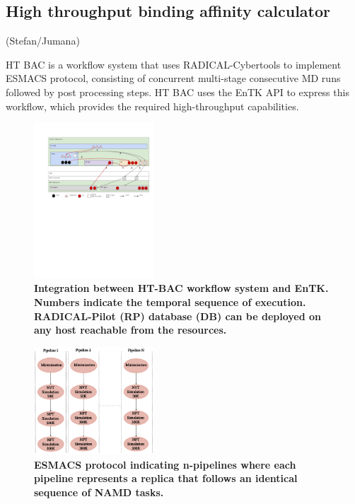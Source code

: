 \subsection{High throughput binding affinity calculator}

(Stefan/Jumana)

HT BAC is a workflow system that uses RADICAL-Cybertools to implement ESMACS protocol, consisting of concurrent multi-stage consecutive MD runs followed by post processing steps. HT BAC uses the EnTK API to express this workflow, which provides the required high-throughput capabilities. 

\begin{figure}[tb]
\centering
  \includegraphics[width=0.4\textwidth]{FIGURES/ht-bac-rp_integration.pdf}
  \caption{\bf Integration between HT-BAC workflow system and EnTK. Numbers indicate the temporal sequence of execution. RADICAL-Pilot (RP) database (DB) can be deployed on any host reachable from the resources.}
   \label{figure:ht-bac_rp}
\end{figure}

\begin{figure}[tb]
\centering
  \includegraphics[width=0.4\textwidth]{FIGURES/HT-BAC-NAMD-pipelines-control-flow-only.pdf}
  \caption{\bf ESMACS protocol indicating n-pipelines where each pipeline represents a replica that follows an identical sequence of NAMD tasks.}
   \label{figure:namd-pipelines}
\end{figure}


